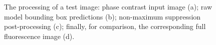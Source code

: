\begin{figure}%
    \centering
    \qquad
    \qquad
    \qquad
\caption{The processing of a test image: phase contrast input image (a); raw model bounding box predictions (b); non-maximum suppression post-processing (c); finally, for comparison, the corresponding full fluorescence image (d).}
\label{fig:nms}
\end{figure}

